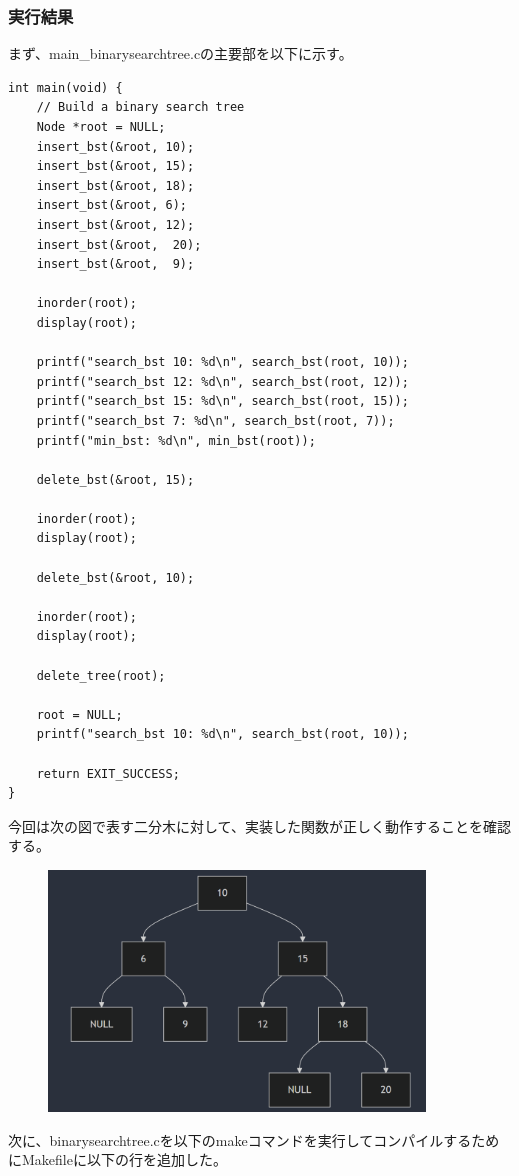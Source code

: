 \documentclass{ltjsarticle}
\begin{document}
\subsubsection{実行結果}\label{subsubsec:実行結果2}
まず、main\_binarysearchtree.cの主要部を以下に示す。
\begin{lstlisting}
int main(void) {
    // Build a binary search tree
    Node *root = NULL;
    insert_bst(&root, 10);
    insert_bst(&root, 15);
    insert_bst(&root, 18);
    insert_bst(&root, 6);
    insert_bst(&root, 12);
    insert_bst(&root,  20);
    insert_bst(&root,  9);

    inorder(root);
    display(root);

    printf("search_bst 10: %d\n", search_bst(root, 10));
    printf("search_bst 12: %d\n", search_bst(root, 12));
    printf("search_bst 15: %d\n", search_bst(root, 15));
    printf("search_bst 7: %d\n", search_bst(root, 7));
    printf("min_bst: %d\n", min_bst(root));

    delete_bst(&root, 15);

    inorder(root);
    display(root);

    delete_bst(&root, 10);

    inorder(root);
    display(root);

    delete_tree(root);

    root = NULL;
    printf("search_bst 10: %d\n", search_bst(root, 10));

    return EXIT_SUCCESS;
}   
\end{lstlisting}
\newpage
今回は次の図で表す二分木に対して、実装した関数が正しく動作することを確認する。
\begin{figure}[htbp]
  \begin{center}
      \includegraphics[width = 100mm]{binarysearchtree1.png}
  \end{center}
\end{figure}
次に、binarysearchtree.cを以下のmakeコマンドを実行してコンパイルするためにMakefileに以下の行を追加した。
\end{document}
